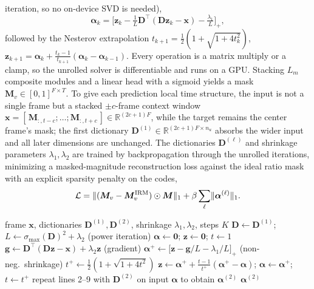 \documentclass{article}
\DeclarePairedDelimiter{\norm}{\lVert}{\rVert}
\newcommand{\R}{\mathbb{R}}
\newcommand{\D}{\bm{D}}
\newcommand{\M}{\bm{M}}
\newcommand{\xv}{\bm{x}}
\newcommand{\av}{\bm{\alpha}}
\begin{document}
iteration, so no on-device SVD is needed),
\begin{equation}
\label{eq:fista}
\av_{k}=\big[\bm z_k-\tfrac1L\D^\top(\D\bm z_k-\xv)-\tfrac{\lambda_1}L\big]_+,
\end{equation}
followed by the Nesterov extrapolation
$t_{k+1}=\tfrac12(1+\sqrt{1+4t_k^2})$,
$\bm z_{k+1}=\av_k+\tfrac{t_k-1}{t_{k+1}}(\av_k-\av_{k-1})$. Every operation is a
matrix multiply or a clamp, so the unrolled solver is differentiable and runs on a
GPU. Stacking $L_m$ composite modules and a linear head with a sigmoid yields a
mask $\M_v\in[0,1]^{F\times T}$. To give each prediction local time structure, the
input is not a single frame but a stacked $\pm c$-frame context window
$\xv=[\,\M_{:,t-c};\dots;\M_{:,t+c}\,]\in\R^{(2c+1)F}$, while the target remains the
center frame's mask; the first dictionary $\D^{(1)}\in\R^{(2c+1)F\times n_u}$ absorbs
the wider input and all later dimensions are unchanged. The dictionaries
$\D^{(\ell)}$ and shrinkage
parameters $\lambda_1,\lambda_2$ are trained by backpropagation through the unrolled
iterations, minimizing a masked-magnitude reconstruction loss against the ideal
ratio mask with an explicit sparsity penalty on the codes,
\begin{equation}
\label{eq:scnloss}
\mathcal L=\norm{(\M_v-\M_v^{\mathrm{IRM}})\odot\M}_1
+\beta\sum_\ell\norm{\av^{(\ell)}}_1.
\end{equation}
\begin{algorithm}[t]
\caption{Composite module forward pass (one of $L_m$). All steps are matrix
multiplies and clamps, so the pass is differentiable and runs on a GPU.}
\label{alg:scn}
\begin{algorithmic}[1]
 frame $\xv$, dictionaries $\D^{(1)},\D^{(2)}$,
shrinkage $\lambda_1,\lambda_2$, steps $K$
\STATE $\D \leftarrow \D^{(1)}$;\; $L\leftarrow \sigma_{\max}(\D)^2+\lambda_2$
\hfill {\small(power iteration)}
\STATE $\av\leftarrow\bm0$;\; $\bm z\leftarrow\bm0$;\; $t\leftarrow1$
  \STATE $\bm g\leftarrow \D^\top(\D\bm z-\xv)+\lambda_2\bm z$
  \hfill {\small(gradient)}
  \STATE $\av^{+}\leftarrow\big[\bm z-\bm g/L-\lambda_1/L\big]_+$
  \hfill {\small(non-neg.\ shrinkage)}
  \STATE $t^{+}\leftarrow\tfrac12(1+\sqrt{1+4t^2})$
  \STATE $\bm z\leftarrow\av^{+}+\tfrac{t-1}{t^{+}}(\av^{+}-\av)$;\;
         $\av\leftarrow\av^{+}$;\; $t\leftarrow t^{+}$
\ENDFOR
\STATE repeat lines 2--9 with $\D^{(2)}$ on input $\av$ to obtain $\av^{(2)}$
 $\av^{(2)}$
\end{algorithmic}
\end{algorithm}
\end{document}
